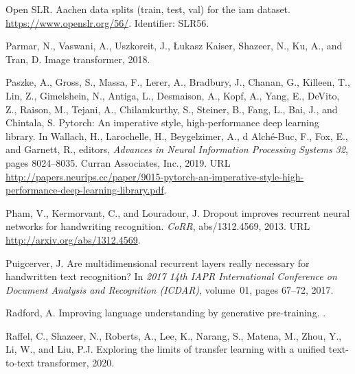 \documentclass[runningheads]{llncs}
\begin{document}
\begin{thebibliography}{33}
{Open SLR}.
\newblock Aachen data splits (train, test, val) for the iam dataset.
\newblock \url{https://www.openslr.org/56/}.
\newblock Identifier: SLR56.

Parmar, N., Vaswani, A., Uszkoreit, J., Łukasz Kaiser, Shazeer, N., Ku, A.,
  and Tran, D.
\newblock Image transformer, 2018.

Paszke, A., Gross, S., Massa, F., Lerer, A., Bradbury, J., Chanan, G., Killeen,
  T., Lin, Z., Gimelshein, N., Antiga, L., Desmaison, A., Kopf, A., Yang, E.,
  DeVito, Z., Raison, M., Tejani, A., Chilamkurthy, S., Steiner, B., Fang, L.,
  Bai, J., and Chintala, S.
\newblock Pytorch: An imperative style, high-performance deep learning library.
\newblock In Wallach, H., Larochelle, H., Beygelzimer, A., d\textquotesingle
  Alch\'{e}-Buc, F., Fox, E., and Garnett, R., editors, \emph{Advances in
  Neural Information Processing Systems 32}, pages 8024--8035. Curran
  Associates, Inc., 2019.
\newblock URL
  \url{http://papers.neurips.cc/paper/9015-pytorch-an-imperative-style-high-performance-deep-learning-library.pdf}.

Pham, V., Kermorvant, C., and Louradour, J.
\newblock Dropout improves recurrent neural networks for handwriting
  recognition.
\newblock \emph{CoRR}, abs/1312.4569, 2013.
\newblock URL \url{http://arxiv.org/abs/1312.4569}.

{Puigcerver}, J.
\newblock Are multidimensional recurrent layers really necessary for
  handwritten text recognition?
\newblock In \emph{2017 14th IAPR International Conference on Document Analysis
  and Recognition (ICDAR)}, volume~01, pages 67--72, 2017.

Radford, A.
\newblock Improving language understanding by generative pre-training.
.

Raffel, C., Shazeer, N., Roberts, A., Lee, K., Narang, S., Matena, M., Zhou,
  Y., Li, W., and Liu, P.J.
\newblock Exploring the limits of transfer learning with a unified text-to-text
  transformer, 2020.


\end{thebibliography}
\end{document}

